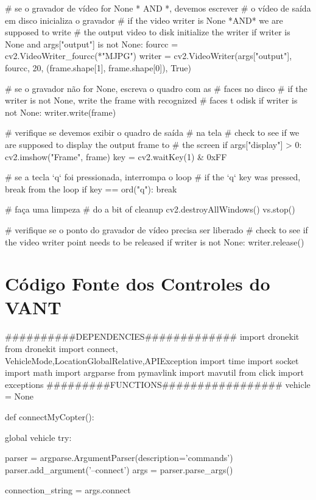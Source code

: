 \begin{apendicesenv}
\begin{python_}
	# se o gravador de vídeo for None * AND *, devemos escrever
	# o vídeo de saída em disco inicializa o gravador
	# if the video writer is None *AND* we are supposed to write
	# the output video to disk initialize the writer
	if writer is None and args["output"] is not None:
		fourcc = cv2.VideoWriter_fourcc(*"MJPG")
		writer = cv2.VideoWriter(args["output"], fourcc, 20,
		(frame.shape[1], frame.shape[0]), True)
	
	# se o gravador não for None, escreva o quadro com as
	# faces no disco
	# if the writer is not None, write the frame with recognized
	# faces t odisk
	if writer is not None:
		writer.write(frame)
	
	# verifique se devemos exibir o quadro de saída
	# na tela
	# check to see if we are supposed to display the output frame to
	# the screen
	if args["display"] > 0:
		cv2.imshow("Frame", frame)
		key = cv2.waitKey(1) & 0xFF
	
	# se a tecla `q` foi pressionada, interrompa o loop
	# if the `q` key was pressed, break from the loop
	if key == ord("q"):
		break
	
	# faça uma limpeza
	# do a bit of cleanup
	cv2.destroyAllWindows()
	vs.stop()
	
	# verifique se o ponto do gravador de vídeo precisa ser liberado
	# check to see if the video writer point needs to be released
	if writer is not None:
		writer.release()
\end{python_}

\chapter{Código Fonte dos Controles do VANT}

\begin{python_}
##########DEPENDENCIES#############
import dronekit
from dronekit import connect, VehicleMode,LocationGlobalRelative,APIException
import time
import socket
import math
import argparse
from pymavlink import mavutil
from click import exceptions
#########FUNCTIONS#################
vehicle = None

def connectMyCopter():

	global vehicle
	try:
	
		parser = argparse.ArgumentParser(description='commands')
		parser.add_argument('--connect')
		args = parser.parse_args()
		
		connection_string = args.connect
		

\end{python_}
\end{apendicesenv}
